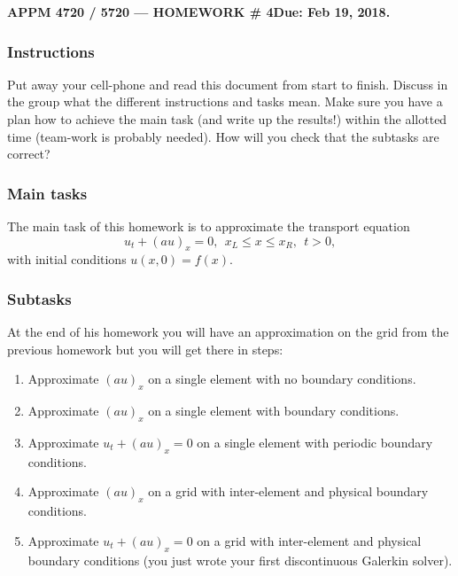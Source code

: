 \documentclass[12pt]{article}
\newcommand{\be}{\begin{equation}}
\newcommand{\ee}{\end{equation}}
\begin{document}
\begin{center}
\textbf{APPM 4720 / 5720 --- HOMEWORK  \# 4\hfill Due: Feb 19, 2018.}
\end{center}

\subsubsection*{Instructions}
Put away your cell-phone and read this document from start to finish. Discuss in the group what the different instructions and tasks mean. Make sure you have a plan how to achieve the main task (and write up the results!) within the allotted time (team-work is probably needed). How will you check that the subtasks are correct?      

\subsubsection*{Main tasks}
The main task of this homework is to approximate the transport equation
\be
u_t + (au)_x = 0, \ \ x_L \le x \le x_R, \ \ t > 0,
\ee
with initial conditions $u(x,0) = f(x)$. 

\subsubsection*{Subtasks}
At the end of his homework you will have an approximation on the grid from the previous homework but you will get there in steps:
\begin{enumerate}
\item Approximate $(au)_x$ on a single element with no boundary conditions. 
\item Approximate $(au)_x$ on a single element with boundary conditions. 
\item Approximate $u_t + (au)_x = 0$ on a single element with periodic boundary conditions. 
\item Approximate $(au)_x$ on a grid with inter-element and physical boundary conditions. 
\item Approximate $u_t + (au)_x = 0$ on a grid with inter-element and physical boundary conditions (you just wrote your first discontinuous Galerkin solver). 
\end{enumerate}
\end{document}
